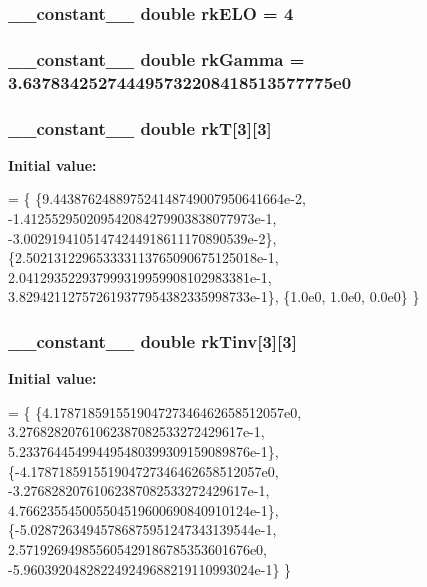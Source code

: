 \subsubsection[{\texorpdfstring{rk\+E\+LO}{rkELO}}]{\setlength{\rightskip}{0pt plus 5cm}\+\_\+\+\_\+constant\+\_\+\+\_\+ double rk\+E\+LO = 4}\hypertarget{radau2a_8cu_a4a47a5c2b6246610bacf303f65dc5010}{}\label{radau2a_8cu_a4a47a5c2b6246610bacf303f65dc5010}
\subsubsection[{\texorpdfstring{rk\+Gamma}{rkGamma}}]{\setlength{\rightskip}{0pt plus 5cm}\+\_\+\+\_\+constant\+\_\+\+\_\+ double rk\+Gamma = 3.\+637834252744495732208418513577775e0}\hypertarget{radau2a_8cu_a1fe408f1f4381de0ba7cc7711ece69b3}{}\label{radau2a_8cu_a1fe408f1f4381de0ba7cc7711ece69b3}
\subsubsection[{\texorpdfstring{rkT}{rkT}}]{\setlength{\rightskip}{0pt plus 5cm}\+\_\+\+\_\+constant\+\_\+\+\_\+ double rkT\mbox{[}3\mbox{]}\mbox{[}3\mbox{]}}\hypertarget{radau2a_8cu_a23863b2377430f09acb8523df5be7c3a}{}\label{radau2a_8cu_a23863b2377430f09acb8523df5be7c3a}
{\bfseries Initial value\+:}
\begin{DoxyCode}
= \{
\{9.443876248897524148749007950641664e-2,
-1.412552950209542084279903838077973e-1,
-3.00291941051474244918611170890539e-2\},
\{2.502131229653333113765090675125018e-1,
2.041293522937999319959908102983381e-1,
3.829421127572619377954382335998733e-1\},
\{1.0e0,
1.0e0,
0.0e0\}
\}
\end{DoxyCode}
\subsubsection[{\texorpdfstring{rk\+Tinv}{rkTinv}}]{\setlength{\rightskip}{0pt plus 5cm}\+\_\+\+\_\+constant\+\_\+\+\_\+ double rk\+Tinv\mbox{[}3\mbox{]}\mbox{[}3\mbox{]}}\hypertarget{radau2a_8cu_a0544fa464c96867fbe9b2db33c118361}{}\label{radau2a_8cu_a0544fa464c96867fbe9b2db33c118361}
{\bfseries Initial value\+:}
\begin{DoxyCode}
= \{
\{4.178718591551904727346462658512057e0,
3.27682820761062387082533272429617e-1,
5.233764454994495480399309159089876e-1\},
\{-4.178718591551904727346462658512057e0,
-3.27682820761062387082533272429617e-1,
4.766235545005504519600690840910124e-1\},
\{-5.02872634945786875951247343139544e-1,
2.571926949855605429186785353601676e0,
-5.960392048282249249688219110993024e-1\}
\}
\end{DoxyCode}

